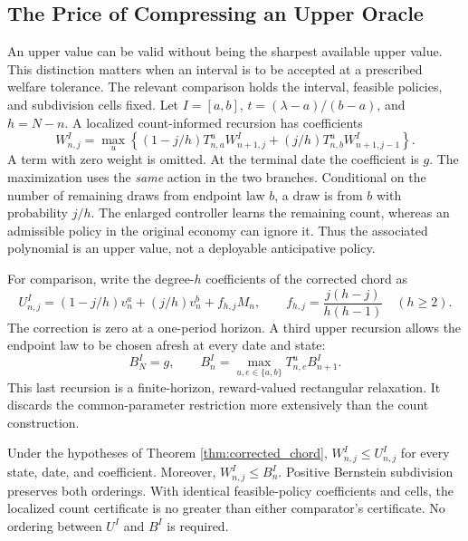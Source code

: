 \subsection{The Price of Compressing an Upper Oracle}
\label{sec:r7_compression}
An upper value can be valid without being the sharpest available upper value. This distinction matters when an interval is to be accepted at a prescribed welfare tolerance. The relevant comparison holds the interval, feasible policies, and subdivision cells fixed. Let $I=[a,b]$, $t=(\lambda-a)/(b-a)$, and $h=N-n$. A localized count-informed recursion has coefficients
\begin{equation}
 W^I_{n,j}=\max_u\left\{
 (1-j/h)T^u_{n,a}W^I_{n+1,j}
 +(j/h)T^u_{n,b}W^I_{n+1,j-1}\right\}.
 \label{eq:r7_count}
\end{equation}
A term with zero weight is omitted. At the terminal date the coefficient is $g$. The maximization uses the \emph{same} action in the two branches. Conditional on the number of remaining draws from endpoint law $b$, a draw is from $b$ with probability $j/h$. The enlarged controller learns the remaining count, whereas an admissible policy in the original economy can ignore it. Thus the associated polynomial is an upper value, not a deployable anticipative policy.

For comparison, write the degree-$h$ coefficients of the corrected chord as
\begin{equation}
 U^I_{n,j}=(1-j/h)v_n^a+(j/h)v_n^b+f_{h,j}M_n,
 \qquad f_{h,j}=\frac{j(h-j)}{h(h-1)}\quad(h\geq2).
 \label{eq:r7_compressed_coefficients}
\end{equation}
The correction is zero at a one-period horizon. A third upper recursion allows the endpoint law to be chosen afresh at every date and state:
\begin{equation}
 B^I_N=g,\qquad B^I_n=\max_{u,e\in\{a,b\}}T^u_{n,e}B^I_{n+1}.
 \label{eq:r7_rectangular}
\end{equation}
This last recursion is a finite-horizon, reward-valued rectangular relaxation. It discards the common-parameter restriction more extensively than the count construction.

\begin{proposition}
\label{prop:r7_dominance}
Under the hypotheses of Theorem \ref{thm:corrected_chord}, $W^I_{n,j}\leq U^I_{n,j}$ for every state, date, and coefficient. Moreover, $W^I_{n,j}\leq B^I_n$. Positive Bernstein subdivision preserves both orderings. With identical feasible-policy coefficients and cells, the localized count certificate is no greater than either comparator's certificate. No ordering between $U^I$ and $B^I$ is required.
\end{proposition}

